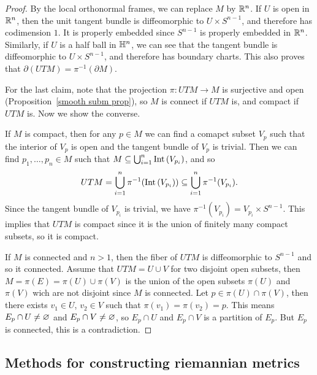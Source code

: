 \begin{proof}
By the local orthonormal frames, we can replace $M$ by $\mathbb{R}^n$. If $U$ is open in $\mathbb{R}^n$, then the unit tangent bundle is diffeomorphic to $U\times S^{n-1}$, and therefore has codimension $1$. It is properly embedded since $S^{n-1}$ 
is properly embedded in $\mathbb{R}^n$. Similarly, if $U$ is a half ball in $\mathbb{H}^n$, we can see that the tangent bundle is diffeomorphic to $U\times S^{n-1}$, and therefore has boundary charts. 
This also proves that $\partial(UTM)=\pi^{-1}(\partial M)$.\par
For the last claim, note that the projection $\pi:UTM\to M$ is surjective and open (Proposition~\ref{smooth subm prop}), so $M$ is connect if $UTM$ is, and compact if $UTM$ is. Now we show the converse.\par
If $M$ is compact, then for any $p\in M$ we can find a comapct subset $V_p$ such that the interior of $V_p$ is open and the tangent bundle of $V_p$ is 
trivial. Then we can find 
$p_1,\dots,p_n\in M$ such that $M\subseteq\bigcup_{i=1}^{n}\mathrm{Int}\,(V_{p_i})$, and so 
\[UTM=\bigcup_{i=1}^{n}\pi^{-1}(\mathrm{Int}\,(V_{p_i}))\subseteq\bigcup_{i=1}^{n}\pi^{-1}(V_{p_i}).\]
Since the tangent bundle of $V_{p_i}$ is trivial, we have $\pi^{-1}(V_{p_i})=V_{p_i}\times S^{n-1}$. This implies that $UTM$ is compact since it is the union of 
finitely many compact subsets, so it is compact.\par
If $M$ is connected and $n>1$, then the fiber of $UTM$ is diffeomorphic to $S^{n-1}$ and so it connected. Assume that $UTM=U\cup V$ for two disjoint open subsets, then 
$M=\pi(E)=\pi(U)\cup\pi(V)$ is the union of the open subsets $\pi(U)$ and $\pi(V)$ wich are not disjoint since $M$ is connected. Let $p\in\pi(U)\cap\pi(V)$, then there 
exists $v_1\in U$, $v_2\in V$ such that $\pi(v_1)=\pi(v_2)=p$. This means $E_p\cap U\neq\varnothing$ and $E_p\cap V\neq\varnothing$, so $E_p\cap U$ and $E_p\cap V$ is a partition of $E_p$. 
But $E_p$ is connected, this is a contradiction.
\end{proof}
\subsection{Methods for constructing riemannian metrics}
